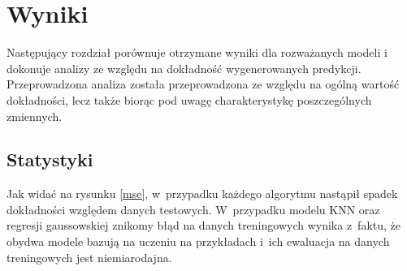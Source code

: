 

\section{Wyniki}

Następujący rozdział porównuje otrzymane wyniki dla rozważanych modeli i dokonuje analizy ze względu na dokładność wygenerowanych predykcji. Przeprowadzona analiza została przeprowadzona ze względu na ogólną wartość dokładności, lecz także biorąc pod uwagę charakterystykę poszczególnych zmiennych.

\subsection{Statystyki}

Jak widać na rysunku \ref{mse}, w~przypadku każdego algorytmu nastąpił
spadek dokładności względem danych testowych. W~przypadku modelu KNN oraz
regresji gaussowskiej znikomy błąd na danych treningowych wynika z~faktu, 
że obydwa modele bazują na uczeniu na przykładach i~ich ewaluacja na 
danych treningowych jest niemiarodajna. 

